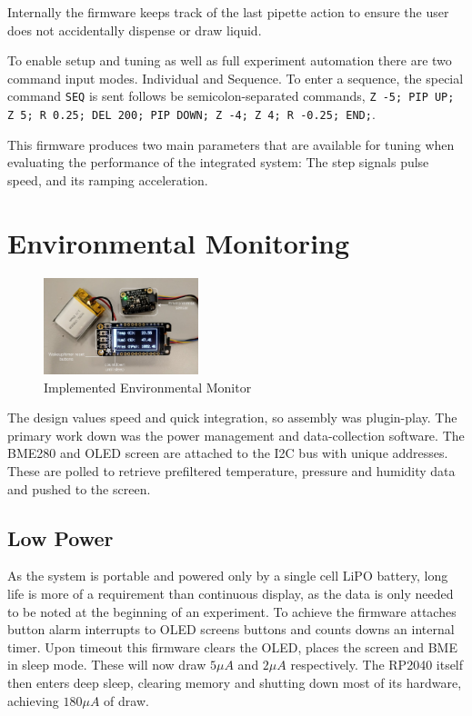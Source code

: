 Internally the firmware keeps track of the last pipette action to ensure the user does not accidentally dispense or draw liquid.

To enable setup and tuning as well as full experiment automation there are two command input modes. Individual and Sequence. To enter a sequence, the special command \texttt{SEQ} is sent follows be semicolon-separated commands, \texttt{Z -5; PIP UP; Z 5; R 0.25; DEL 200; PIP DOWN; Z -4; Z 4; R -0.25; END;}.

This firmware produces two main parameters that are available for tuning when evaluating the performance of the integrated system: The step signals pulse speed, and its ramping acceleration.

\section{Environmental Monitoring}

\begin{figure}[h]
    \centering
    \includegraphics[width=0.4\textwidth]{img/env_mon.png}
    \caption{Implemented Environmental Monitor}
\end{figure}

The design values speed and quick integration, so assembly was plugin-play. The primary work down was the power management and data-collection software. The BME280 and OLED screen are attached to the I2C bus with unique addresses. These are polled to retrieve prefiltered temperature, pressure and humidity data and pushed to the screen.

\subsection*{Low Power}
As the system is portable and powered only by a single cell LiPO battery, long life is more of a requirement than continuous display, as the data is only needed to be noted at the beginning of an experiment. To achieve the firmware attaches button alarm interrupts to OLED screens buttons and counts downs an internal timer. Upon timeout this firmware clears the OLED, places the screen and BME in sleep mode. These will now draw $5\mu A$ and $2 \mu A$ respectively. The RP2040 itself then enters deep sleep, clearing memory and shutting down most of its hardware, achieving $180\mu A$ of draw. 

